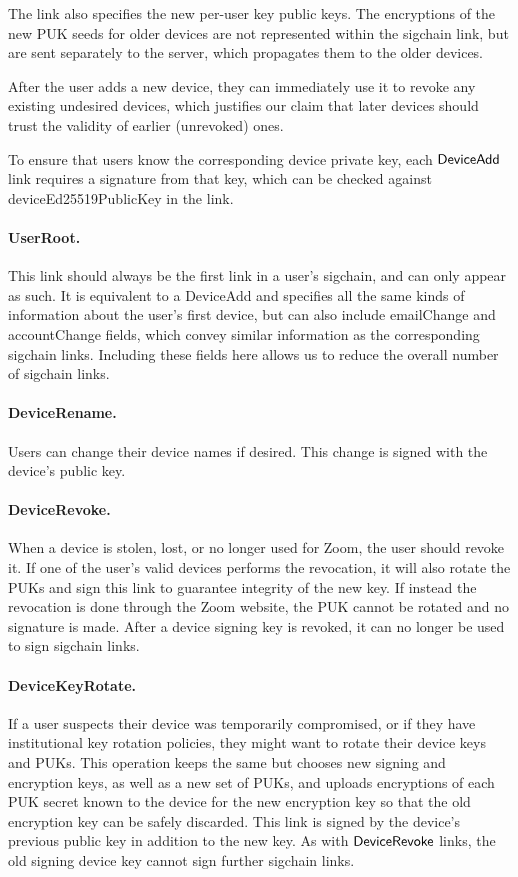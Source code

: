 The link also specifies the new per-user key public keys. The encryptions of the new PUK seeds for
older devices are not represented within the sigchain link, but are sent separately to the server,
which propagates them to the older devices.

After the user adds a new device, they can immediately use it to revoke any existing undesired
devices, which justifies our claim that later devices should trust the validity of earlier
(unrevoked) ones.

To ensure that users know the corresponding device private key, each $\mathsf{DeviceAdd}{}$ link requires a
signature from that key, which can be checked against \textsf{deviceEd25519PublicKey} in the link.

\paragraph{UserRoot.} This link should always be the first link in a user's sigchain, and can only
appear as such. It is equivalent to a DeviceAdd and specifies all the same kinds of information
about the user's first device, but can also include \textsf{emailChange} and \textsf{accountChange}
fields, which convey similar information as the corresponding sigchain links. Including these fields
here allows us to reduce the overall number of sigchain links.

\paragraph{DeviceRename.} Users can change their device names if desired. This change is signed with
the device's public key.

\paragraph{DeviceRevoke.} When a device is stolen, lost, or no longer used for Zoom, the user should
revoke it. If one of the user's valid devices performs the revocation, it will also rotate the PUKs
and sign this link to guarantee integrity of the new key. If instead the revocation is done through
the Zoom website, the PUK cannot be rotated and no signature is made. After a device signing key is
revoked, it can no longer be used to sign sigchain links.

\paragraph{DeviceKeyRotate.} If a user suspects their device was temporarily compromised, or if they
have institutional key rotation policies, they might want to rotate their device keys and PUKs. This
operation keeps the same \deviceid but chooses new signing and encryption keys, as well as a new set
of PUKs, and uploads encryptions of each PUK secret known to the device for the new encryption key
so that the old encryption key can be safely discarded. This link is signed by the device's previous
public key in addition to the new key. As with $\mathsf{DeviceRevoke}{}$ links, the old signing device key
cannot sign further sigchain links.

